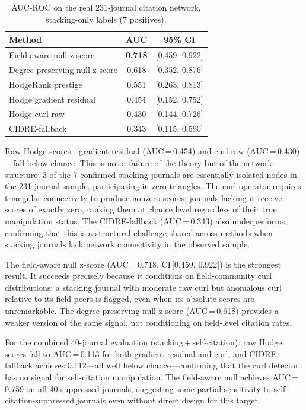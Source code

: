 \documentclass[twocolumn,11pt,letterpaper]{article}
\begin{document}
\begin{table}[!t]
  \centering
  \caption{AUC-ROC on the real 231-journal citation network,
           stacking-only labels (7 positives).}
  \label{tab:auc}
  \begin{tabular}{lcc}
    \toprule
    Method & AUC & 95\% CI \\
    \midrule
    Field-aware null z-score       & \textbf{0.718} & [0.459, 0.922] \\
    Degree-preserving null z-score & 0.618          & [0.352, 0.876] \\
    HodgeRank prestige             & 0.551          & [0.263, 0.813] \\
    Hodge gradient residual        & 0.454          & [0.152, 0.752] \\
    Hodge curl raw                 & 0.430          & [0.144, 0.726] \\
    CIDRE-fallback                 & 0.343          & [0.115, 0.590] \\
    \bottomrule
  \end{tabular}
\end{table}

Raw Hodge scores---gradient residual (AUC\,=\,0.454) and curl raw
(AUC\,=\,0.430)---fall below chance. This is not a failure of the theory but
of the network structure: 3 of the 7 confirmed stacking journals are
essentially isolated nodes in the 231-journal sample, participating in zero
triangles. The curl operator requires triangular connectivity to produce
nonzero scores; journals lacking it receive scores of exactly zero, ranking
them at chance level regardless of their true manipulation status. The
CIDRE-fallback (AUC\,=\,0.343) also underperforms, confirming that this is a
structural challenge shared across methods when stacking journals lack network
connectivity in the observed sample.

The field-aware null z-score (AUC\,=\,0.718, CI\,[0.459, 0.922]) is the
strongest result. It succeeds precisely because it conditions on field-community
curl distributions: a stacking journal with moderate raw curl but anomalous
curl relative to its field peers is flagged, even when its absolute scores are
unremarkable. The degree-preserving null z-score (AUC\,=\,0.618) provides a
weaker version of the same signal, not conditioning on field-level citation
rates.

For the combined 40-journal evaluation (stacking\,+\,self-citation): raw
Hodge scores fall to AUC\,=\,0.113 for both gradient residual and curl, and
CIDRE-fallback achieves 0.112---all well below chance---confirming that the
curl detector has no signal for self-citation manipulation. The field-aware
null achieves AUC\,=\,0.759 on all 40 suppressed journals, suggesting some
partial sensitivity to self-citation-suppressed journals even without direct
design for this target.
\end{document}
